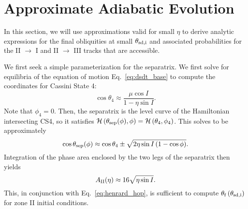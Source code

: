\documentclass[
        fleqn,
        usenatbib,
        referee,
    ]{mnras}
\newcommand*{\p}[1]{\left(#1\right)}
\begin{document}
\section{Approximate Adiabatic Evolution}\label{s:ad_approx}

In this section, we will use approximations valid for small $\eta$ to derive
analytic expressions for the final obliquities at small $\theta_{\rm sd, i}$ and
associated probabilities for the II $\to$ I and II $\to$ III tracks that are
accessible.

We first seek a simple parameterization for the separatrix. We first solve for
equilibria of the equation of motion Eq.~\eqref{eq:dsdt_base} to compute the
coordinates for Cassini State 4:
\begin{equation}
    \cos \theta_4 \approx \frac{\mu \cos I}{1 - \eta \sin I}.
\end{equation}
Note that $\phi_4 = 0$. Then, the separatrix is the level curve of the
Hamiltonian intersecting CS4, so it satisfies $\mathcal{H}\p{\theta_{\rm
sep}(\phi), \phi} = \mathcal{H}\p{\theta_4, \phi_4}$. This solves to be
approximately
\begin{equation}
    \cos \theta_{\rm sep}(\phi) \approx \cos \theta_4 \pm
        \sqrt{2\eta \sin I\p{1 - \cos \phi}}.
\end{equation}
Integration of the phase area enclosed by the two legs of the separatrix then
yields
\begin{equation}
    A_{\rm II}(\eta) \approx 16\sqrt{\eta \sin I}.\label{eq:a_approx}
\end{equation}
This, in conjunction with Eq.~\eqref{eq:henrard_hop}, is sufficient to compute
$\theta_{\rm f}\p{\theta_{\rm sd, i}}$ for zone II initial conditions.
\end{document}
